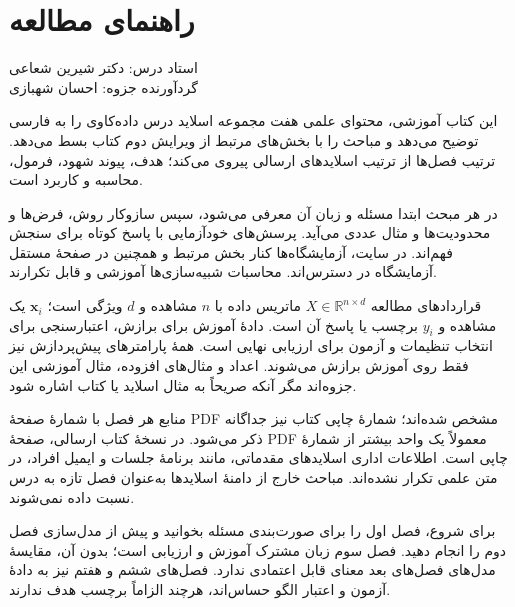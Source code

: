 \documentclass[12pt,a4paper,oneside]{report}
\begin{document}
\setcounter{chapter}{0}
\chapter*{راهنمای مطالعه}
\begin{center}{\small\color{muted} استاد درس: دکتر شیرین شعاعی\\[2mm] گردآورنده جزوه: احسان شهبازی}\end{center}

این کتاب آموزشی، محتوای علمی هفت مجموعه اسلاید درس داده‌کاوی را به فارسی توضیح می‌دهد و مباحث را با بخش‌های مرتبط از ویرایش دوم کتاب  بسط می‌دهد. ترتیب فصل‌ها از ترتیب اسلایدهای ارسالی پیروی می‌کند؛ هدف، پیوند شهود، فرمول، محاسبه و کاربرد است.

در هر مبحث ابتدا مسئله و زبان آن معرفی می‌شود، سپس سازوکار روش، فرض‌ها و محدودیت‌ها و مثال عددی می‌آید. پرسش‌های خودآزمایی با پاسخ کوتاه برای سنجش فهم‌اند. در سایت، آزمایشگاه‌ها کنار بخش مرتبط و همچنین در صفحهٔ مستقل آزمایشگاه در دسترس‌اند. محاسبات شبیه‌سازی‌ها آموزشی و قابل تکرارند.

\begin{important}{قراردادهای مطالعه}
$X\in\mathbb R^{n\times d}$ ماتریس داده با $n$ مشاهده و $d$ ویژگی است؛ $\mathbf x_i$ یک مشاهده و $y_i$ برچسب یا پاسخ آن است. دادهٔ آموزش برای برازش، اعتبارسنجی برای انتخاب تنظیمات و آزمون برای ارزیابی نهایی است. همهٔ پارامترهای پیش‌پردازش نیز فقط روی آموزش برازش می‌شوند. اعداد و مثال‌های افزوده، مثال آموزشی این جزوه‌اند مگر آنکه صریحاً به مثال اسلاید یا کتاب اشاره شود.
\end{important}

منابع هر فصل با شمارهٔ صفحهٔ PDF مشخص شده‌اند؛ شمارهٔ چاپی کتاب نیز جداگانه ذکر می‌شود. در نسخهٔ کتاب ارسالی، صفحهٔ PDF معمولاً یک واحد بیشتر از شمارهٔ چاپی است. اطلاعات اداری اسلایدهای مقدماتی، مانند برنامهٔ جلسات و ایمیل افراد، در متن علمی تکرار نشده‌اند. مباحث خارج از دامنهٔ اسلایدها به‌عنوان فصل تازه به درس نسبت داده نمی‌شوند.

برای شروع، فصل اول را برای صورت‌بندی مسئله بخوانید و پیش از مدل‌سازی فصل دوم را انجام دهید. فصل سوم زبان مشترک آموزش و ارزیابی است؛ بدون آن، مقایسهٔ مدل‌های فصل‌های بعد معنای قابل اعتمادی ندارد. فصل‌های ششم و هفتم نیز به دادهٔ آزمون و اعتبار الگو حساس‌اند، هرچند الزاماً برچسب هدف ندارند.
\end{document}
